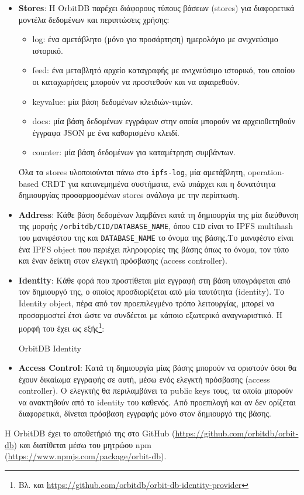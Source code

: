 \begin{itemize}
	\item \textbf{Stores}: Η OrbitDB παρέχει διάφορους τύπους βάσεων (stores) για διαφορετικά μοντέλα δεδομένων και περιπτώσεις χρήσης:
	
	\begin{itemize}
		\item log: ένα αμετάβλητο (μόνο για προσάρτηση) ημερολόγιο με ανιχνεύσιμο ιστορικό.
		\item feed: ένα μεταβλητό αρχείο καταγραφής με ανιχνεύσιμο ιστορικό, του οποίου οι καταχωρήσεις μπορούν να προστεθούν και να αφαιρεθούν.
		\item keyvalue: μία βάση δεδομένων κλειδιών-τιμών.
		\item docs: μία βάση δεδομένων εγγράφων στην οποία μπορούν να αρχειοθετηθούν έγγραφα JSON με ένα καθορισμένο κλειδί.
		\item counter: μία βάση δεδομένων για καταμέτρηση συμβάντων.
	\end{itemize}
	
	Όλα τα stores υλοποιούνται πάνω στο \texttt{ipfs-log}, μία αμετάβλητη, operation-based CRDT για κατανεμημένα συστήματα, ενώ υπάρχει και η δυνατότητα δημιουργίας προσαρμοσμένων stores ανάλογα με την περίπτωση.
	
	\item \textbf{Address}: Κάθε βάση δεδομένων λαμβάνει κατά τη δημιουργία της μία διεύθυνση της μορφής \texttt{/orbitdb/CID/DATABASE\_NAME}, όπου \texttt{CID} είναι το IPFS multihash του μανιφέστου της και \texttt{DATABASE\_NAME} το όνομα της βάσης.\cite{4.2-orbitdb-guide}Το μανιφέστο είναι ένα IPFS object που περιέχει πληροφορίες της βάσης όπως το όνομα, τον τύπο και έναν δείκτη στον ελεγκτή πρόσβασης (access controller).
	
	\item \textbf{Identity}: Κάθε φορά που προστίθεται μία εγγραφή στη βάση υπογράφεται από τον δημιουργό της, ο οποίος προσδιορίζεται από μία ταυτότητα (identity). Το Identity object, πέρα από τον προεπιλεγμένο τρόπο λειτουργίας, μπορεί να προσαρμοστεί έτσι ώστε να συνδέεται με κάποιο εξωτερικό αναγνωριστικό.
	Η μορφή του έχει ως εξής\footnote{Βλ. και \url{https://github.com/orbitdb/orbit-db-identity-provider}}:
	
	\begin{enumitemcenteredfigure}
		\caption{OrbitDB Identity}
		\label{figure:4-2-4-2-orbit-db-identity}
	\end{enumitemcenteredfigure}

	\item \textbf{Access Control}: Κατά τη δημιουργία μίας βάσης μπορούν να οριστούν όσοι θα έχουν δικαίωμα εγγραφής σε αυτή, μέσω ενός ελεγκτή πρόσβασης (access controller). Ο ελεγκτής θα περιλαμβάνει τα public keys τους, τα οποία μπορούν να ανακτηθούν από το identity του καθενός. Από προεπιλογή και αν δεν ορίζεται διαφορετικά, δίνεται πρόσβαση εγγραφής μόνο στον δημιουργό της βάσης.
\end{itemize}

Η OrbitDB έχει το αποθετήριό της στο GitHub (\url{https://github.com/orbitdb/orbit-db}) και διατίθεται μέσω του μητρώου npm (\url{https://www.npmjs.com/package/orbit-db}).
